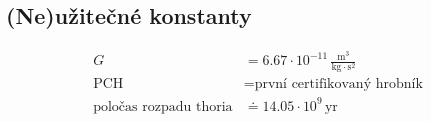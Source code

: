 \documentclass[10pt,a4paper,landscape]{article}
\begin{document}
\begin{multicols}{2}[]
\section*{(Ne)užitečné konstanty}
\begin{subequations}
\begin{align*}
G &= 6.67\cdot 10^{-11}\, \frac{\mathrm{m}^3}{\mathrm{kg}\cdot \mathrm{s}^2} \\
\mathrm{PCH} &= \text{první certifikovaný hrobník} \\
\text{poločas rozpadu thoria} &\doteq 14.05\cdot 10^{9}\,\mathrm{yr}
\end{align*}
\end{subequations}

\end{multicols}
\end{document}
